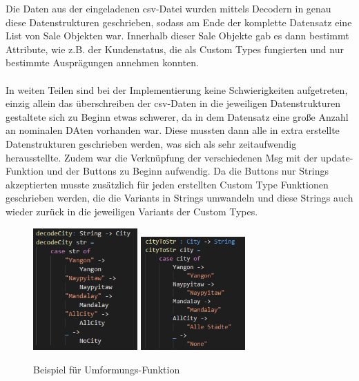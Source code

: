 \documentclass[usegeometry=true]{scrartcl}
\begin{document}
\noindent Die Daten aus der eingeladenen csv-Datei wurden mittels Decodern in genau diese Datenstrukturen geschrieben, sodass am Ende der komplette Datensatz eine List von Sale
Objekten war. Innerhalb dieser Sale Objekte gab es dann bestimmt Attribute, wie z.B. der Kundenstatus, die als Custom Types fungierten und nur bestimmte Ausprägungen annehmen
konnten.\\ \\
\noindent In weiten Teilen sind bei der Implementierung keine Schwierigkeiten aufgetreten, einzig allein das überschreiben der csv-Daten in die jeweiligen Datenstrukturen
gestaltete sich zu Beginn etwas schwerer, da in dem Datensatz eine große Anzahl an nominalen DAten vorhanden war. Diese mussten dann alle in extra erstellte Datenstrukturen
geschrieben werden, was sich als sehr zeitaufwendig herausstellte. Zudem war die Verknüpfung der verschiedenen Msg mit der update-Funktion und der Buttons zu Beginn aufwendig.
Da die Buttons nur Strings akzeptierten musste zusätzlich für jeden erstellten Custom Type Funktionen geschrieben werden, die die Variants in Strings umwandeln und diese Strings auch
wieder zurück in die jeweiligen Variants der Custom Types.

\begin{figure} [H]
	\begin{center}
		\includegraphics[width=4cm]{IMG/StrToCity}
		\includegraphics[width=4cm]{IMG/cityToStr}
		\caption{Beispiel für Umformungs-Funktion}
		\label{fig:Umformung}
	\end{center}
\end{figure}
\end{document}
